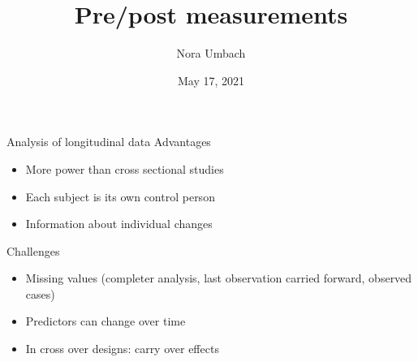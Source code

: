 \documentclass{beamer}
\title{Pre/post measurements}
\author{Nora Umbach%
}
\date{May 17, 2021}
\newcommand{\vect}[1]{\mathbf{#1}}
\begin{document}
\begin{frame}{}
\thispagestyle{empty}
\titlepage
\end{frame}



\begin{frame}{Analysis of longitudinal data}
Advantages

\begin{itemize}
\item More power than cross sectional studies
\item Each subject is its own control person
\item Information about individual changes
\end{itemize}

Challenges
\begin{itemize}
\item Missing values (completer analysis, last observation carried forward,
  observed cases)
\item Predictors can change over time
\item In cross over designs: carry over effects
\end{itemize}
\end{frame}


% 
% 
% 
\end{document}
